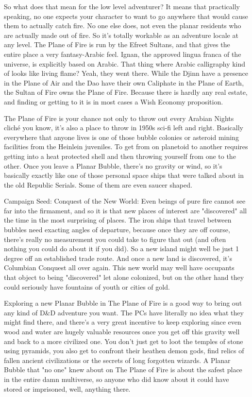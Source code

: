 So what does that mean for the low level adventurer? It means that practically speaking, no one expects your character to want to go anywhere that would cause them to actually catch fire. No one else does, not even the planar residents who are actually made out of fire. So it's totally workable as an adventure locale at any level. The Plane of Fire is run by the Efreet Sultans, and that gives the entire place a very fantasy-Arabic feel. Ignan, the approved lingua franca of the universe, is explicitly based on Arabic. That thing where Arabic calligraphy kind of looks like living flame? Yeah, they went there. While the Djinn have a presence in the Plane of Air and the Dao have their own Caliphate in the Plane of Earth, the Sultan of Fire owns the Plane of Fire. Because there is hardly any real estate, and finding or getting to it is in most cases a Wish Economy proposition.

The Plane of Fire is your chance not only to throw out every Arabian Nights cliché you know, it's also a place to throw in 1950s sci-fi left and right. Basically everywhere that anyone lives is one of those bubble colonies or asteroid mining facilities from the Heinlein juveniles. To get from on planetoid to another requires getting into a heat protected shell and then throwing yourself from one to the other. Once you leave a Planar Bubble, there's no gravity or wind, so it's basically exactly like one of those personal space ships that were talked about in the old Republic Serials. Some of them are even saucer shaped.

Campaign Seed: Conquest of the New World: Even beings of pure fire cannot see far into the firmament, and so it is that new places of interest are "discovered" all the time in the most surprising of places. The iron ships that travel between bubbles need exacting angles of departure, because once they are off course, there's really no measurement you could take to figure that out (and often nothing you could do about it if you did). So a new island might well be just 1 degree off an established trade route. And once a new land is discovered, it's Columbian Conquest all over again. This new world may well have occupants that object to being "discovered" let alone colonized, but on the other hand they could seriously have fountains of youth or cities of gold.

Exploring a new Planar Bubble in The Plane of Fire is a good way to bring out any kind of D\&D adventure you want. The PCs have literally no idea what they might find there, and there's a very great incentive to keep exploring since even wood and water are hugely valuable resources once you get off this gravity well and back to a more civilized one. You don't just get to loot the temples of stone using pyramids, you also get to confront their heathen demon gods, find relics of fallen ancient civilizations or the secrets of long forgotten wizards. A Planar Bubble that "no one" knew about on The Plane of Fire is about the safest place in the entire damn multiverse, so anyone who did know about it could have stored or imprisoned, well, anything there.

